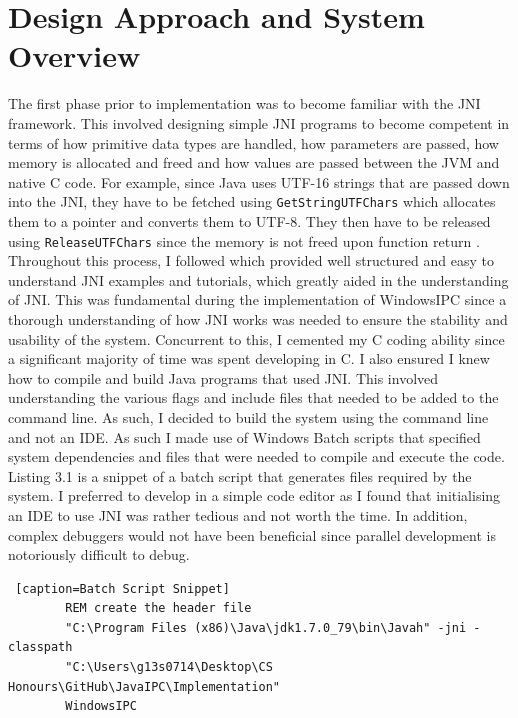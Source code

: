 \documentclass[12pt] {newrucsthesis}    %
\def\code#1{\texttt{#1}}
\begin{document}
    \section{Design Approach and System Overview} \label{devapproach}
      The first phase prior to implementation was to become familiar with
      the JNI framework. This involved designing simple JNI programs to become competent
      in terms of how primitive data types are handled, how parameters are passed, how memory is
      allocated and freed and how values are passed between the JVM and native C code.
      For example, since Java uses UTF-16 strings that are passed down into the JNI, they
      have to be fetched using \code{GetStringUTFChars} which allocates them to a pointer and converts
      them to UTF-8. They then have to be released using \code{ReleaseUTFChars} since the memory
      is not freed upon function return \citep{Android}. Throughout this process,
      I followed \cite{LiangJNISpecification} which provided well structured and easy to understand
      JNI examples and tutorials, which greatly aided in the understanding of JNI. This was fundamental
      during the implementation of WindowsIPC since a thorough understanding of how JNI works was needed
      to ensure the stability and usability of the system. Concurrent to this, I cemented my C coding ability since
      a significant majority of time was spent developing in C. I also ensured I knew how to compile and build Java programs
      that used JNI. This involved understanding the various flags and include files that needed to be added to the command line.
      As such, I decided to build the system using the command line and not an IDE. As such I made use of Windows Batch scripts that
      specified system dependencies and files that were needed to compile and execute the code. Listing 3.1 is a
      snippet of a batch script that generates files required by the system. I preferred to develop in a
      simple code editor as I found that initialising an IDE to use JNI was rather tedious and not worth the time. In addition,
      complex debuggers would not have been beneficial since parallel development is notoriously difficult to debug.

      \begin {lstlisting} [caption=Batch Script Snippet]
        REM create the header file
        "C:\Program Files (x86)\Java\jdk1.7.0_79\bin\Javah" -jni -classpath
        "C:\Users\g13s0714\Desktop\CS Honours\GitHub\JavaIPC\Implementation"
        WindowsIPC
      \end{lstlisting}
\end{document}
